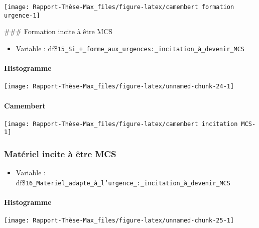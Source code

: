 \documentclass[
]{article}
\providecommand{\tightlist}{%
  \setlength{\itemsep}{0pt}\setlength{\parskip}{0pt}}
\begin{document}
\begin{center}\texttt{[image: Rapport-Thèse-Max\_files/figure-latex/camembert formation urgence-1]} \end{center}

\hfill\break
\hfill\break
\hfill\break
\hfill\break
\#\#\# Formation incite à être MCS

\begin{itemize}
\tightlist
\item
  Variable :
  df\$\texttt{15\_Si\_+\_forme\_aux\_urgences:\_incitation\_à\_devenir\_MCS}
\end{itemize}

\paragraph{Histogramme}\label{histogramme-4}

\begin{center}\texttt{[image: Rapport-Thèse-Max\_files/figure-latex/unnamed-chunk-24-1]} \end{center}

\paragraph{Camembert}\label{camembert-4}

\begin{center}\texttt{[image: Rapport-Thèse-Max\_files/figure-latex/camembert incitation MCS-1]} \end{center}

\hfill\break
\hfill\break
\hfill\break
\hfill\break

\subsubsection{Matériel incite à être
MCS}\label{matuxe9riel-incite-uxe0-uxeatre-mcs}

\begin{itemize}
\tightlist
\item
  Variable :
  df\$\texttt{16\_Materiel\_adapte\_à\_l’urgence\_:\_incitation\_à\_devenir\_MCS}
\end{itemize}

\paragraph{Histogramme}\label{histogramme-5}

\begin{center}\texttt{[image: Rapport-Thèse-Max\_files/figure-latex/unnamed-chunk-25-1]} \end{center}
\end{document}
